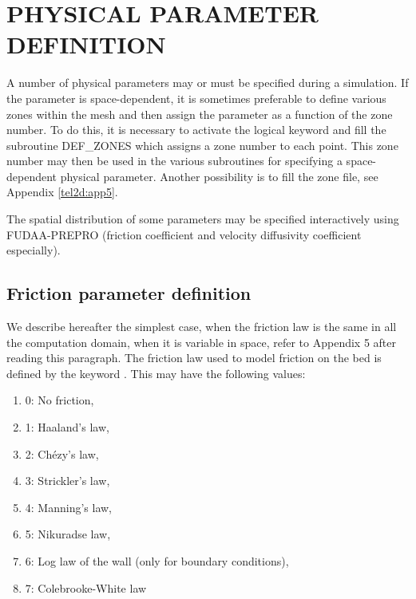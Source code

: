 
\chapter{  PHYSICAL PARAMETER DEFINITION}
\label{ch:phys:param:def}
 A number of physical parameters may or must be specified during a simulation. If the parameter is space-dependent, it is sometimes preferable to define various zones within the mesh and then assign the parameter as a function of the zone number. To do this, it is necessary to activate the logical keyword  and fill the subroutine DEF\_ZONES which assigns a zone number to each point. This zone number may then be used in the various subroutines for specifying a space-dependent physical parameter. Another possibility is to fill the zone file, see Appendix \ref{tel2d:app5}.

 The spatial distribution of some parameters may be specified interactively using FUDAA-PREPRO (friction coefficient and velocity diffusivity coefficient especially).


\section{Friction parameter definition}
\label{sec:frict:param}
 We describe hereafter the simplest case, when the friction law is the same in all the computation domain, when it is variable in space, refer to Appendix 5 after reading this paragraph. The friction law used to model friction on the bed is defined by the keyword . This may have the following values:

\begin{enumerate}
\item[\nonumber]  0: No friction,

\item [\nonumber] 1: Haaland's law,

\item [\nonumber] 2: Ch\'{e}zy's law,

\item[\nonumber]  3: Strickler's law,

\item[\nonumber]  4: Manning's law,

\item [\nonumber] 5: Nikuradse law,

\item [\nonumber] 6: Log law of the wall (only for boundary conditions),

\item [\nonumber] 7: Colebrooke-White law
\end{enumerate}


